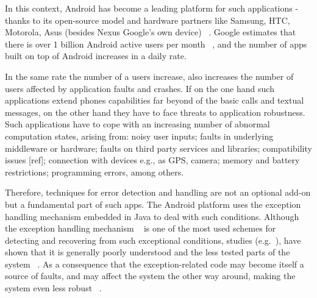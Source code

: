 \documentclass[conference]{IEEEtran}
\begin{document}
In this context, Android has become a leading platform for such applications - thanks to its open-source 
model and hardware partners like Samsung, HTC, Motorola, Asus (besides Nexus Google's
 own device) ~\cite{gartner}.  Google estimates that there is over 1 billion Android active users per month ~\cite{googleio},
and the number of apps built on top of Android increases in a daily rate.




In the same rate the number of a users increase, also increases 
the number of users affected by application faults and crashes.
If on the one hand such applications extend phones capabilities 
far beyond of the basic calls and textual messages, on the other hand
they have to face threats to application robustness.
Such applications have to cope with an increasing number of abnormal
computation states, arising from:
 noisy user inputs; faults in underlying middleware or hardware; 
faults on third party services and libraries; compatibility issues [ref]; 
connection with devices e.g., as GPS, camera; memory and battery restrictions; 
 programming errors, among others.



Therefore, techniques for error detection and handling are not  an optional add-on but a 
fundamental part of such apps.
The Android platform uses the exception handling mechanism embedded
 in Java to deal with such conditions. Although the exception handling mechanism
~\cite{goodenough1975exception} is one of the most used schemes for
detecting and recovering from such exceptional conditions, studies (e.g.~\cite{miller1997issues,Robil00,shah2010understanding, garcia2007extracting,garcia2001comparative,cabral2007exception,coelho2011unveiling}),
have shown that it is generally poorly understood and the less tested parts of the system ~\cite{coelho2011unveiling}.
As a consequence that the exception-related code may become itself a source of faults, 
and may affect the system the other way around, making the system even less robust ~\cite{robillard2003static,coelho2011unveiling}.
\end{document}
